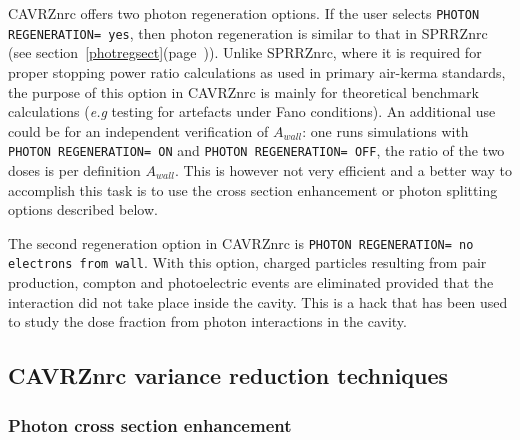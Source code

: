 \documentclass[12pt,twoside]{article}  %
\newcommand{\lpage}[1]{(page~\pageref{#1})}
\begin{document}
CAVRZnrc offers two photon regeneration options.  If the user selects
{\tt PHOTON REGENERATION= yes}, then photon regeneration is similar to
that in SPRRZnrc (see section~\ref{photregsect}\lpage{photregsect}). 
Unlike SPRRZnrc, where it is required for proper 
stopping power ratio calculations as used in primary 
air-kerma standards, the purpose of this option in CAVRZnrc is 
mainly for theoretical benchmark calculations ({\em e.g} testing 
for artefacts under Fano conditions). An additional use 
could be for an independent verification of $A_{wall}$: one 
runs simulations with {\tt PHOTON REGENERATION= ON} and {\tt PHOTON
REGENERATION= OFF}, the 
ratio of the two doses is per definition $A_{wall}$. This is 
however not very efficient and a better way to accomplish 
this task is to use the cross section enhancement or 
photon splitting options described below. 
 
The second regeneration option in CAVRZnrc is {\tt PHOTON REGENERATION= no
electrons from wall}.  With this option, charged particles resulting from
pair production, compton and photoelectric events are eliminated provided
that the interaction did not take place inside the cavity. 
This is a hack that has been used to study 
the dose fraction from photon interactions in the cavity.

\subsection{CAVRZnrc variance reduction techniques}

\subsubsection{Photon cross section enhancement}
\label{cavrz_cse}
 
\end{document}

